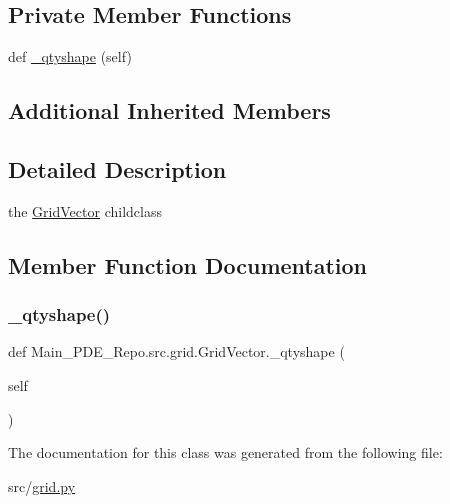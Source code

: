 \subsection*{Private Member Functions}
\begin{DoxyCompactItemize}
\item 
def \hyperlink{classMain__PDE__Repo_1_1src_1_1grid_1_1GridVector_ab622dfed79cd7bdf4c4049f7fb856e2b}{\+\_\+qtyshape} (self)
\end{DoxyCompactItemize}
\subsection*{Additional Inherited Members}


\subsection{Detailed Description}
the \hyperlink{classMain__PDE__Repo_1_1src_1_1grid_1_1GridVector}{Grid\+Vector} childclass 

\subsection{Member Function Documentation}
\mbox{\label{classMain__PDE__Repo_1_1src_1_1grid_1_1GridVector_ab622dfed79cd7bdf4c4049f7fb856e2b}} 
\subsubsection{\texorpdfstring{\+\_\+qtyshape()}{\_qtyshape()}}
{\footnotesize\ttfamily def Main\+\_\+\+P\+D\+E\+\_\+\+Repo.\+src.\+grid.\+Grid\+Vector.\+\_\+qtyshape (\begin{DoxyParamCaption}\item[{}]{self }\end{DoxyParamCaption})\hspace{0.3cm}{\ttfamily [private]}}



The documentation for this class was generated from the following file\+:\begin{DoxyCompactItemize}
\item 
src/\hyperlink{grid_8py}{grid.\+py}\end{DoxyCompactItemize}
